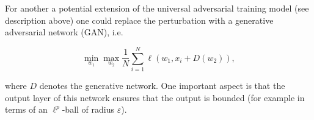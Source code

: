 For another a potential extension of the universal adversarial training model (see description above) one could replace the perturbation with a generative adversarial network (GAN), i.e.

$$ \min_{w_1} \max_{w_2} \frac1N \sum_{i = 1}^N \ell(w_1, x_i + D(w_2)) ,$$

where $D$ denotes the generative network. One important aspect is that the output layer of this network ensures that the output is bounded (for example in terms of an $\ell^p$-ball of radius $\varepsilon$). 
